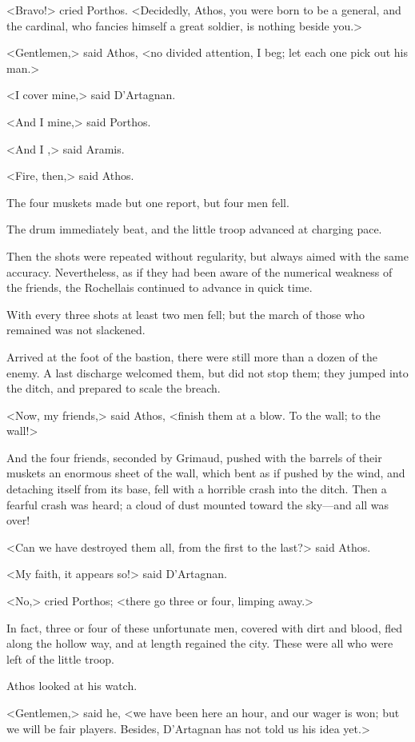 <Bravo!> cried Porthos. <Decidedly, Athos, you were born to be a general, and the cardinal, who fancies himself a great soldier, is nothing beside you.> 

<Gentlemen,> said Athos, <no divided attention, I beg; let each one pick out his man.> 

<I cover mine,> said D'Artagnan. 

<And I mine,> said Porthos. 

<And I ,> said Aramis. 

<Fire, then,> said Athos. 

The four muskets made but one report, but four men fell. 

The drum immediately beat, and the little troop advanced at charging pace. 

Then the shots were repeated without regularity, but always aimed with the same accuracy. Nevertheless, as if they had been aware of the numerical weakness of the friends, the Rochellais continued to advance in quick time. 

With every three shots at least two men fell; but the march of those who remained was not slackened. 

Arrived at the foot of the bastion, there were still more than a dozen of the enemy. A last discharge welcomed them, but did not stop them; they jumped into the ditch, and prepared to scale the breach. 

<Now, my friends,> said Athos, <finish them at a blow. To the wall; to the wall!> 

And the four friends, seconded by Grimaud, pushed with the barrels of their muskets an enormous sheet of the wall, which bent as if pushed by the wind, and detaching itself from its base, fell with a horrible crash into the ditch. Then a fearful crash was heard; a cloud of dust mounted toward the sky—and all was over! 

<Can we have destroyed them all, from the first to the last?> said Athos. 

<My faith, it appears so!> said D'Artagnan. 

<No,> cried Porthos; <there go three or four, limping away.> 

In fact, three or four of these unfortunate men, covered with dirt and blood, fled along the hollow way, and at length regained the city. These were all who were left of the little troop. 

Athos looked at his watch. 

<Gentlemen,> said he, <we have been here an hour, and our wager is won; but we will be fair players. Besides, D'Artagnan has not told us his idea yet.> 

